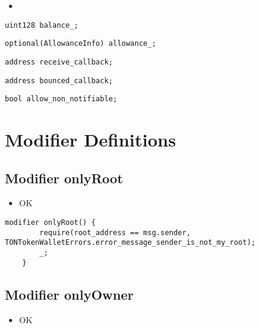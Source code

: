 \begin{itemize}
\item \issueGlobal{}
\end{itemize}

\begin{lstlisting}[firstnumber=31]
    uint128 balance_;
\end{lstlisting}

\begin{lstlisting}[firstnumber=32]
    optional(AllowanceInfo) allowance_;
\end{lstlisting}

\begin{lstlisting}[firstnumber=34]
    address receive_callback;
\end{lstlisting}

\begin{lstlisting}[firstnumber=35]
    address bounced_callback;
\end{lstlisting}

\begin{lstlisting}[firstnumber=36]
    bool allow_non_notifiable;
\end{lstlisting}

\section{Modifier Definitions}

\subsection{Modifier onlyRoot}

\begin{itemize}
\item OK
\end{itemize}

\begin{lstlisting}[firstnumber=598]
    modifier onlyRoot() {
        require(root_address == msg.sender, TONTokenWalletErrors.error_message_sender_is_not_my_root);
        _;
    }
\end{lstlisting}

\subsection{Modifier onlyOwner}

\begin{itemize}
\item OK
\end{itemize}

